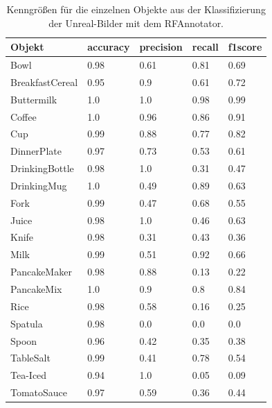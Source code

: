 \begin{table}
\begin{tabularx}{\textwidth}{Xllll}
\textbf{Objekt}	& \textbf{\gls{accuracy}} & \textbf{\gls{precision}}	& \textbf{\gls{recall}}	& \textbf{\gls{f1score}} \\ \hline
Bowl & 0.98 & 0.61 & 0.81 & 0.69 \\  
BreakfastCereal & 0.95 & 0.9 & 0.61 & 0.72 \\  
Buttermilk & 1.0 & 1.0 & 0.98 & 0.99 \\  
Coffee & 1.0 & 0.96 & 0.86 & 0.91 \\  
Cup & 0.99 & 0.88 & 0.77 & 0.82 \\  
DinnerPlate & 0.97 & 0.73 & 0.53 & 0.61 \\  
DrinkingBottle & 0.98 & 1.0 & 0.31 & 0.47 \\  
DrinkingMug & 1.0 & 0.49 & 0.89 & 0.63 \\  
Fork & 0.99 & 0.47 & 0.68 & 0.55 \\  
Juice & 0.98 & 1.0 & 0.46 & 0.63 \\  
Knife & 0.98 & 0.31 & 0.43 & 0.36 \\  
Milk & 0.99 & 0.51 & 0.92 & 0.66 \\  
PancakeMaker & 0.98 & 0.88 & 0.13 & 0.22 \\  
PancakeMix & 1.0 & 0.9 & 0.8 & 0.84 \\  
Rice & 0.98 & 0.58 & 0.16 & 0.25 \\  
Spatula & 0.98 & 0.0 & 0.0 & 0.0 \\  
Spoon & 0.96 & 0.42 & 0.35 & 0.38 \\  
TableSalt & 0.99 & 0.41 & 0.78 & 0.54 \\  
Tea-Iced & 0.94 & 1.0 & 0.05 & 0.09 \\  
TomatoSauce & 0.97 & 0.59 & 0.36 & 0.44 \\  
\end{tabularx}
\caption[Objekt spezifische Kenngrößen des RFAnnotators]{Kenngrößen für die einzelnen Objekte aus der Klassifizierung der Unreal-Bilder mit dem RFAnnotator.}
\end{table}

